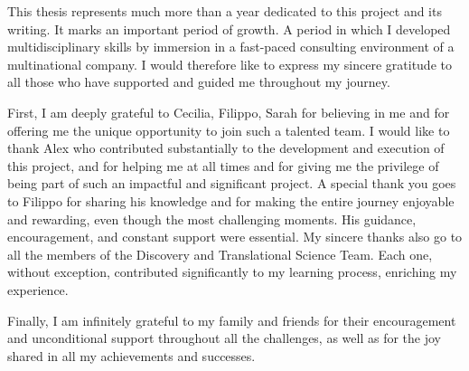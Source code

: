 ﻿%

%

\begin{ntacknowledgements}

This thesis represents much more than a year dedicated to this project and its writing.
It marks an important period of growth. A period in which I developed multidisciplinary skills by immersion in a fast-paced consulting environment of a multinational company.
I would therefore like to express my sincere gratitude to all those who have supported and guided me throughout my journey. 

First, I am deeply grateful to Cecilia, Filippo, Sarah for believing in me and for offering me the unique opportunity to join such a talented team. 
I would like to thank Alex who contributed substantially to the development and execution of this project, and for helping me at all times and for giving me the privilege of being part of such an impactful and significant project.
A special thank you goes to Filippo for sharing his knowledge and for making the entire journey enjoyable and rewarding, even though the most challenging moments.
His guidance, encouragement, and constant support were essential.
My sincere thanks also go to all the members of the Discovery and Translational Science Team. Each one, without exception, contributed significantly to my learning process, enriching my experience.

Finally, I am infinitely grateful to my family and friends for their encouragement and unconditional support throughout all the challenges, as well as for the joy shared in all my achievements and successes.

\end{ntacknowledgements}
